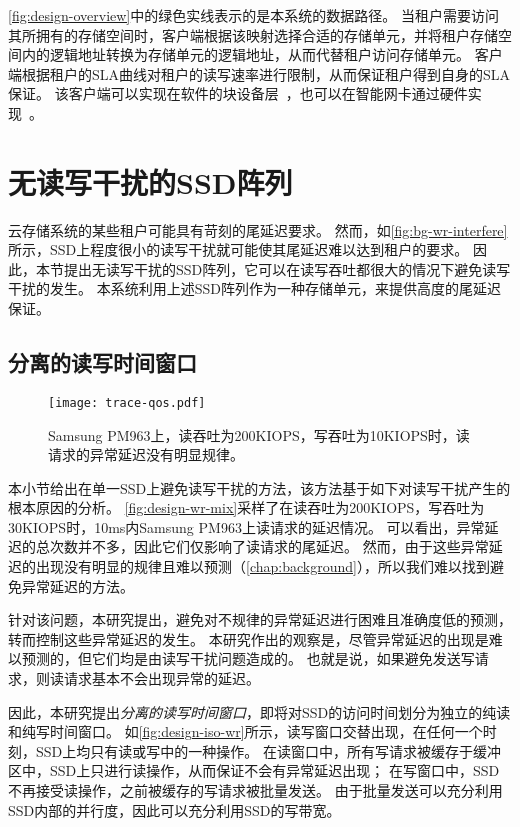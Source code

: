 \autoref{fig:design-overview}中的绿色实线表示的是本系统的数据路径。
当租户需要访问其所拥有的存储空间时，客户端根据该映射选择合适的存储单元，并将租户存储空间内的逻辑地址转换为存储单元的逻辑地址，从而代替租户访问存储单元。
客户端根据租户的SLA曲线对租户的读写速率进行限制，从而保证租户得到自身的SLA保证。
该客户端可以实现在软件的块设备层~\cite{linuxblock}，也可以在智能网卡通过硬件实现~\cite{bluefield}。

\section{无读写干扰的SSD阵列}
\label{sec:design-array}

云存储系统的某些租户可能具有苛刻的尾延迟要求。
然而，如\autoref{fig:bg-wr-interfere}所示，SSD上程度很小的读写干扰就可能使其尾延迟难以达到租户的要求。
因此，本节提出无读写干扰的SSD阵列，它可以在读写吞吐都很大的情况下避免读写干扰的发生。
本系统利用上述SSD阵列作为一种存储单元，来提供高度的尾延迟保证。

\subsection{分离的读写时间窗口}
\label{sec:design-array-isorw}

\begin{figure}[h]
  \centering
  \texttt{[image: trace-qos.pdf]}
  \caption{
        Samsung PM963上，读吞吐为200KIOPS，写吞吐为10KIOPS时，读请求的异常延迟没有明显规律。
      }
  \label{fig:design-wr-mix}
\end{figure}

本小节给出在单一SSD上避免读写干扰的方法，该方法基于如下对读写干扰产生的根本原因的分析。
\autoref{fig:design-wr-mix}采样了在读吞吐为200KIOPS，写吞吐为30KIOPS时，10ms内Samsung PM963上读请求的延迟情况。
可以看出，异常延迟的总次数并不多，因此它们仅影响了读请求的尾延迟。
然而，由于这些异常延迟的出现没有明显的规律且难以预测（\autoref{chap:background}），所以我们难以找到避免异常延迟的方法。

针对该问题，本研究提出，避免对不规律的异常延迟进行困难且准确度低的预测，转而控制这些异常延迟的发生。
本研究作出的观察是，尽管异常延迟的出现是难以预测的，但它们均是由读写干扰问题造成的。
也就是说，如果避免发送写请求，则读请求基本不会出现异常的延迟。

因此，本研究提出\textit{分离的读写时间窗口}，即将对SSD的访问时间划分为独立的纯读和纯写时间窗口。
如\autoref{fig:design-iso-wr}所示，读写窗口交替出现，在任何一个时刻，SSD上均只有读或写中的一种操作。
在读窗口中，所有写请求被缓存于缓冲区中，SSD上只进行读操作，从而保证不会有异常延迟出现；
在写窗口中，SSD不再接受读操作，之前被缓存的写请求被批量发送。
由于批量发送可以充分利用SSD内部的并行度，因此可以充分利用SSD的写带宽。

